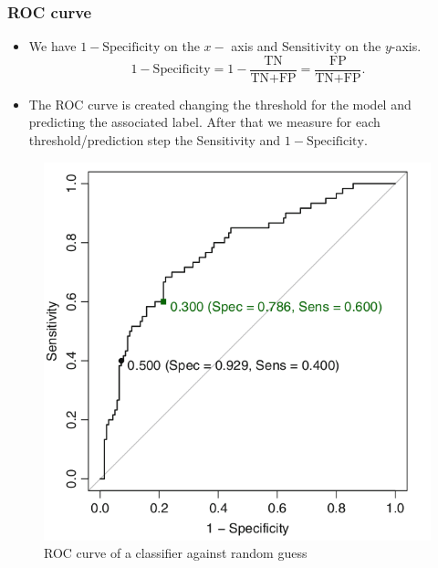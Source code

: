 \documentclass[9pt]{beamer}
\begin{document}
\begin{frame}
\frametitle{ROC curve}
\begin{itemize}
\item We have $1-\mbox{Specificity}$ on the $x-$ axis and $\mbox{Sensitivity}$ on the $y$-axis.
$$1-\mbox{Specificity}= 1 - \dfrac{\mbox{TN}}{\mbox{TN+FP}} = \dfrac{\mbox{FP}}{\mbox{TN+FP}}.$$
\item The ROC curve is created changing the threshold for the model and predicting the associated label. After that we measure for each threshold/prediction step the Sensitivity and $1-\mbox{Specificity}$.
\end{itemize}
\vspace{2mm}
\begin{figure}[ht]
\includegraphics[scale=0.25]{images/ROC curve.png}
\caption{ROC curve of a classifier against random guess}
\end{figure}
\end{frame}
\end{document}
